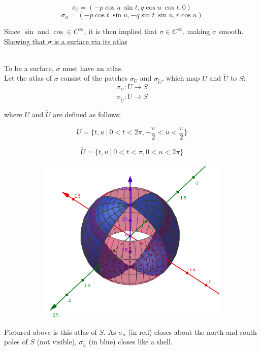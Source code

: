\documentclass[12pt]{article}
\newcommand{\ulind}[1]
{
\noindent
\underline{#1}\\\\
\indent
}
\begin{document}
$$
\sigma_t = (-p \cos u \ \sin t, q \cos u \ \cos t, 0)
$$
$$
\sigma_u = (-p \cos t \ \sin u, -q \sin t \ \sin u, r \cos u)
$$

Since $\sin $ and $\cos \in C^\infty$, it is then implied that $\sigma \in C^\infty$, making $\sigma$ smooth.\\

\ulind{Showing that $\sigma$ is a surface via its atlas}
To be a surface, $\sigma$ must have an atlas.\\

Let the atlas of $\sigma$ consist of the patches $\sigma_U$ and $\sigma_{\widetilde U}$, which map $U$ and $\widetilde U$ to $S$:\\

$$
\sigma_{U} : U \rightarrow S
$$
$$
\sigma_{\widetilde U} : \widetilde U \rightarrow S
$$

where $U$ and $\widetilde U$ are defined as follows:

$$
U = \lbrace t, u \ | \ 0 < t < 2 \pi, -\frac{\pi}{2} < u < \frac{\pi}{2} \rbrace
$$

$$
\widetilde U = \lbrace t, u \ | \ 0 < t < \pi, 0 < u < 2 \pi \rbrace
$$

\begin{figure}[h!]
	\centering
	\begin{subfigure}[b]{0.4\linewidth}
		\includegraphics[width=\linewidth]{./assets/4-2-4/sphere-atlas.png}
	\end{subfigure}
\end{figure}
\indent

Pictured above is this atlas of $S$. As $\sigma_u$ (in red) closes about the north and south poles of $S$ (not visible), $\sigma_{\tilde{u}}$ (in blue) closes like a shell.
\end{document}
